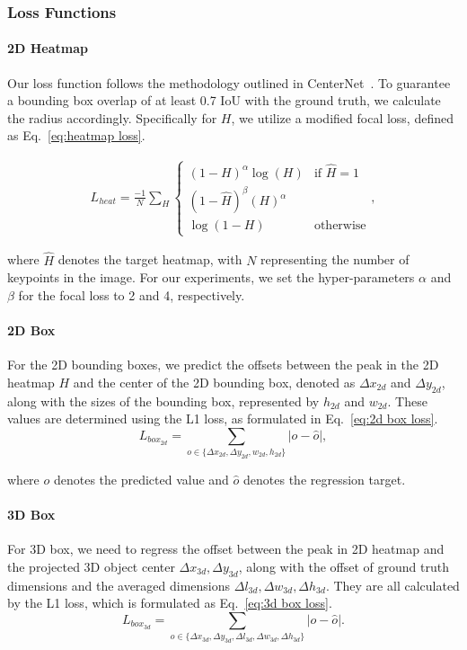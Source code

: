 \documentclass[journal]{IEEEtran}
\begin{document}
	\subsubsection{Loss Functions}
	\paragraph{2D Heatmap} Our loss function follows the methodology outlined in CenterNet~\cite{centernet}. To guarantee a bounding box overlap of at least 0.7 IoU with the ground truth, we calculate the radius accordingly. Specifically for $H$, we utilize a modified focal loss, defined as Eq.~\eqref{eq:heatmap loss}.
	
	\begin{equation}
		\begin{split}
			L_{heat}=\frac{-1}N\sum_{H}\begin{cases}(1-H)^\alpha\log(H)&\text{if }\hat{H}=1\\(1-\hat{H})^\beta({H})^\alpha \\ \log(1-{H}) &\text{otherwise}\end{cases}, 
			\label{eq:heatmap loss}
		\end{split}
	\end{equation}
	
	where $\hat{H}$ denotes the target heatmap, with $N$ representing the number of keypoints in the image. For our experiments, we set the hyper-parameters $\alpha$ and $\beta$ for the focal loss to 2 and 4, respectively.
	
	\paragraph{2D Box} 
	For the 2D bounding boxes, we predict the offsets between the peak in the 2D heatmap $H$ and the center of the 2D bounding box, denoted as $\Delta x_{2d}$ and $\Delta y_{2d}$, along with the sizes of the bounding box, represented by $h_{2d}$ and $w_{2d}$. These values are determined using the L1 loss, as formulated in Eq.~\eqref{eq:2d box loss}.
	\begin{equation}
		L_{box_{2d}} = \sum_{o\in \{\Delta x_{2d}, \Delta y_{2d}, w_{2d}, h_{2d}\}}\lvert o - \hat{o} \rvert
		\label{eq:2d box loss}, 
	\end{equation}
	
	where $o$ denotes the predicted value and $\hat{o}$ denotes the regression target.
	\paragraph{3D Box}
	For 3D box, we need to regress the offset between the peak in 2D heatmap and the projected 3D object center $\Delta x_{3d}, \Delta y_{3d}$, along with the offset of ground truth dimensions and the averaged dimensions $\Delta l_{3d}, \Delta w_{3d}, \Delta h_{3d}$. They are all calculated by the L1 loss, which is formulated as Eq.~\eqref{eq:3d box loss}.
	\begin{equation} 
		L_{box_{3d}} = \sum_{o\in \{\Delta{x_{3d}}, \Delta{y_{3d}}, \Delta l_{3d}, \Delta w_{3d}, \Delta h_{3d}\}}\lvert o - \hat{o} \rvert
		\label{eq:3d box loss}.
	\end{equation}
	
\end{document}
